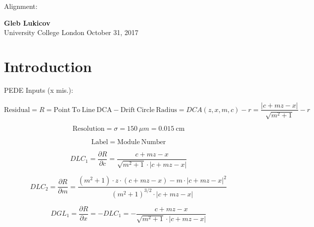 \documentclass[a4paper,11pt]{article}
\begin{document}
\thispagestyle{empty}
\begin{titlepage}
\begin{center}
\end{center}
\begin{center}
	\vspace{1cm}
	{\huge Alignment:}\\
	\vspace{1.5cm}

	\vspace{6cm}
	{\LARGE\bf Gleb Lukicov}\\
	{\Large University College London}
	\vspace{4cm}
	\vfill
	\vspace{0.9cm}
	{\large October 31, 2017}
\end{center}
\end{titlepage}
\clearpage

\thispagestyle{plain}
\section{Introduction} \label{sec:intro}

PEDE Inputs (x mis.): 


\begin{equation}	
\mathrm{Residual}= R =\mathrm{Point \ To \ Line \ DCA} - \mathrm{Drift \ Circle \ Radius} = DCA(z,x,m,c) - r = \frac{ |c+mz-x| }  { \sqrt{m^2+1} } -r
\end{equation}


\begin{equation}	
\mathrm{Resolution} = \sigma = 150 \ \mu m = 0.015 \ \mathrm{cm}
\end{equation}

\begin{equation}	
\mathrm{Label}= \mathrm{Module \ Number}
\end{equation}

\begin{equation}
DLC_1 = \frac{\partial R}{\partial c} = \frac{ c+mz-x }  { \sqrt{m^2+1} \cdot |c+mz-x| }
\end{equation}

\begin{equation}
DLC_2 = \frac{ \partial R}{\partial m} = \frac{ (m^2+1)\cdot z\cdot(c+mz-x) - m\cdot |c+mz-x|^2 }{ (m^2+1)^{3/2} \cdot |c+mz-x|  }
\end{equation}

\begin{equation}	
DGL_1 = \frac{\partial R}{\partial x} = - DLC_1 = - \frac{ c+mz-x }  { \sqrt{m^2+1} \cdot |c+mz-x| }
\end{equation}
\end{document}
